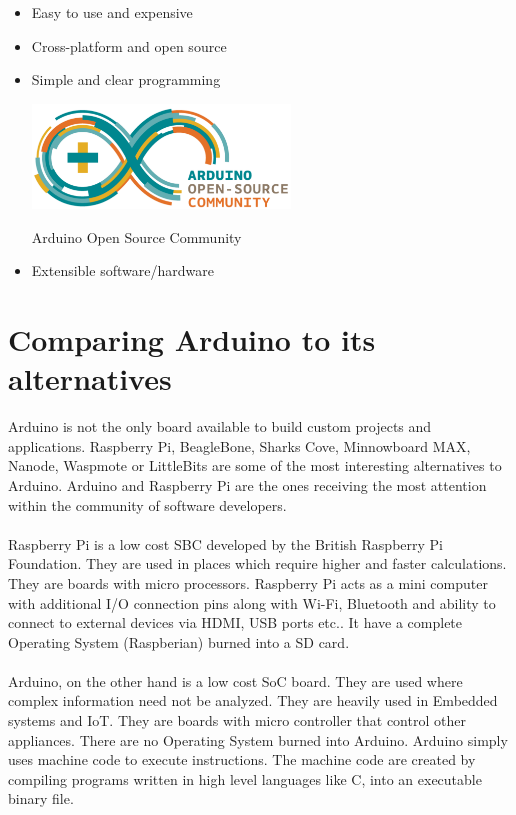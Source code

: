 \begin{itemize}
    \item Easy to use and expensive
    \item Cross-platform and open source
    \item Simple and clear programming
    
    \begin{marginfigure}
        \hspace{-1.5in}\includegraphics[width=2.7in]{Images/Intro_Arduino/arduino_community.png}
        \caption{Arduino Open Source Community}
    \end{marginfigure} 
    
    \item  Extensible software/hardware
\end{itemize}   

\section{Comparing Arduino to its alternatives}
\par Arduino is not the only board available to build custom projects and applications. Raspberry Pi, BeagleBone, Sharks Cove, Minnowboard MAX, Nanode, Waspmote or LittleBits are some of the most interesting alternatives to Arduino. Arduino and Raspberry Pi are the ones receiving the most attention within the community of software developers.

\paragraph{ } Raspberry Pi is a low cost \ac{SBC} developed by the British Raspberry Pi Foundation. They are used in places which require higher and faster calculations. They are boards with micro processors. Raspberry Pi acts as a mini computer with additional I/O connection pins along with Wi-Fi, Bluetooth and ability to connect to external devices via HDMI, USB ports etc.. It have a complete Operating System (Raspberian) burned into a SD card. 

\paragraph{ } Arduino, on the other hand is a low cost \ac{SoC} board. They are used where complex information need not be analyzed. They are heavily used in Embedded systems and \ac{IoT}. They are boards with micro controller that control other appliances. There are no Operating System burned into Arduino. Arduino simply uses machine code to execute instructions. The machine code are created by compiling programs written in high level languages like C, into an executable binary file.

